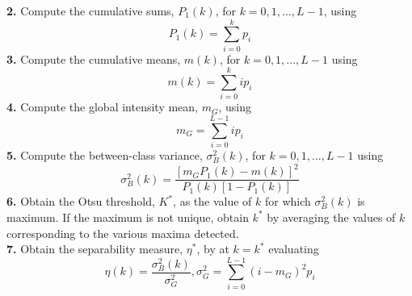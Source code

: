 \textbf{2.} Compute the cumulative sums, $P_1(k)$, for $k=0,1,...,L-1$, using \begin{equation} P_1(k)=\sum_{i=0}^k p_i \end{equation}
\textbf{3.} Compute the cumulative means, $m(k)$, for $k=0,1,...,L-1$ using \begin{equation} m(k)=\sum_{i=0}^k ip_i\end{equation}
\textbf{4.} Compute the global intensity mean, $m_G$, using \begin{equation} m_G=\sum_{i=0}^{L-1}ip_i \end{equation}
\textbf{5.} Compute the between-class variance, $\sigma^2_B(k)$, for $k=0,1,...,L-1$ using \begin{equation} \sigma_B^2(k)=\frac{[m_GP_1(k)-m(k)]^2}{P_1(k)[1-P_1(k)]}\end{equation}
\textbf{6.} Obtain the Otsu threshold, $K^*$, as the value of $k$ for which $\sigma_B^2(k)$ is maximum. If the maximum is not unique, obtain $k^*$ by averaging the values of $k$ corresponding to the various maxima detected. \\
\textbf{7.} Obtain the separability measure, $\eta ^ *$, by at $k=k^*$ evaluating \begin{equation} \eta(k)=\frac{\sigma_B^2(k)}{\sigma_G^2}, \sigma_G^2=\sum_{i=0}^{L-1}(i-m_G)^2p_i \end{equation} 




 